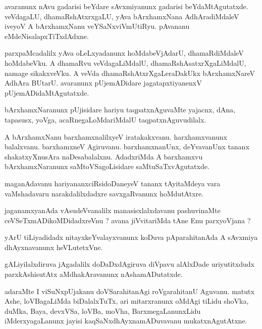 \documentclass{article}
\begin{document}
\begin{mn}%
avaranunx nAvu gadarisi beYdare sAvxmiyanunx gadarisi beYdaMtAgutatxde. veVdagaLU, 
dhamaRshAtxrxgaLU, yAva bArxhamxNana AdhAradiMdaleV iveyoV A bArxhamxNanu 
veYSaNxviVmUtiRyu. pAvananu eMdeNisalapxTiTxdAdxne.
\end{mn}

\begin{mn}%
parxpaMcadalilx yAva oLeLxyadanunx hoMdabeVjAdarU, dhamaRdiMdaleV hoMdabeVku. A dhamaRvu 
veVdagaLiMdalU, dhamaRshAsatxrXgaLiMdalU, namage sikakxveVku. A veVda 
dhamaRshAtxrXgaLeraDakUkx bArxhamxNareV AdhAra BUtarU. avaranunx pUjemADidare 
jagatapxtiyanenxV pUjemADidaMtAgutatxde.
\end{mn}

\begin{mn}%
bArxhamxNaranunx pUjisidare hariyu taqpatxnAguvaMte yajacnx, dAna, tapasusx, yoVga, 
acaRnegaLoMdariMdalU taqpatxnAguvudilalx.
\end{mn}

\begin{mn}%
A bArxhamxNanu barxhamxnalilxyeV iratakakxvanu. harxhamxvanunx balalxvanu. barxhamxneV 
Agiruvanu. barxhamxnanUnx, deYvavanUnx tananx shakatxyXnusAra naDesabalalxnu. AdadxriMda 
A barxhamxvu bArxhamxNaranunx saMtoVSagoLisidare saMtuSaTxvAgutatxde.
\end{mn}

\begin{mn}%
maganAdavanu hariyananxciRsidoDaneyeV tananx tAyitaMdeya vara vaMshadavaru 
narakdalilxdadxre savxgaRvanunx hoMdutAtxre.
\end{mn}

\begin{mn}%
jaganamxyanAda vAsudeVvanalilx manasisxlalxdavanu pashuvinaMte ceVSeTxmADikoMDidadxreVnu ? 
avana jiVvitariMda tAne Enu parxyoVjana ?
\end{mn}

\begin{mn}%
yArU tiLiyadidadx nitayxkeYvalayxvanunx koDuva pAparahitanAda A sAvxmiya dhAyxnavanunx 
heVLutetxVne.
\end{mn}

\begin{mn}%
gALiyilalxdiruva jAgadalilx doDaDxdAgiruva diVpavu alAlxDade uriyutitxdudx parxkAshisutAtx 
aMdhakAravanunx nAshamADutatxde.
\end{mn}

\begin{mn}%
adaraMte I viSuNxpUjakanu doVSarahitanAgi roVgarahitanU Aguvanu. matutx Ashe, loVBagaLiMda 
biDalalxTuTx, ari mitarxranunx oMdAgi tiLidu shoVka, duMka, Baya, devxVSa, loVBa, moVha, 
BarxmegaLanunxLidu iMderxyagaLanunx jayisi kaqSaNxdhAyxnamADuvavanu mukatxnAgutAtxne.
\end{mn}
\end{document}

